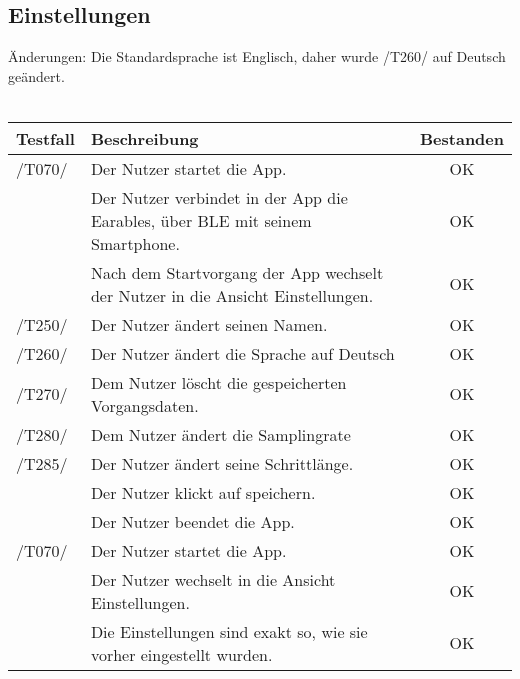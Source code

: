\documentclass[a4paper,12pt]{article}
\begin{document}
\subsection{Einstellungen}
Änderungen: Die Standardsprache ist Englisch, daher wurde /T260/ auf Deutsch geändert.
\\
\\
\begin{tabular}{ |p{1.5cm} | p{12cm} | c| }
	\hline
	\textbf{Testfall} & \textbf{Beschreibung} & \textbf{Bestanden}\\
	\hline
	/T070/ & Der Nutzer startet die App. & OK\\
	\hline
	& Der Nutzer verbindet in der App die Earables, über BLE mit seinem Smartphone. & OK \\
	\hline
	& Nach dem Startvorgang der App wechselt der Nutzer in die Ansicht \glqq Einstellungen\grqq . & OK\\
	\hline
	/T250/ & Der Nutzer ändert seinen Namen. & OK \\
	\hline
	/T260/ & Der Nutzer ändert die Sprache auf Deutsch & OK \\
	\hline
	/T270/ & Dem Nutzer löscht die gespeicherten Vorgangsdaten. & OK \\
	\hline
	/T280/ & Dem Nutzer ändert die Samplingrate & OK \\
	\hline
	/T285/ & Der Nutzer ändert seine Schrittlänge. & OK \\
	\hline
	& Der Nutzer klickt auf speichern. & OK \\
	\hline
	& Der Nutzer beendet die App. & OK \\
	\hline
	/T070/ & Der Nutzer startet die App. & OK \\
	\hline
	& Der Nutzer wechselt in die Ansicht \glqq Einstellungen\grqq . & OK \\
	\hline
	& Die Einstellungen sind exakt so, wie sie vorher eingestellt wurden. & OK \\
	\hline
\end{tabular}
\end{document}
